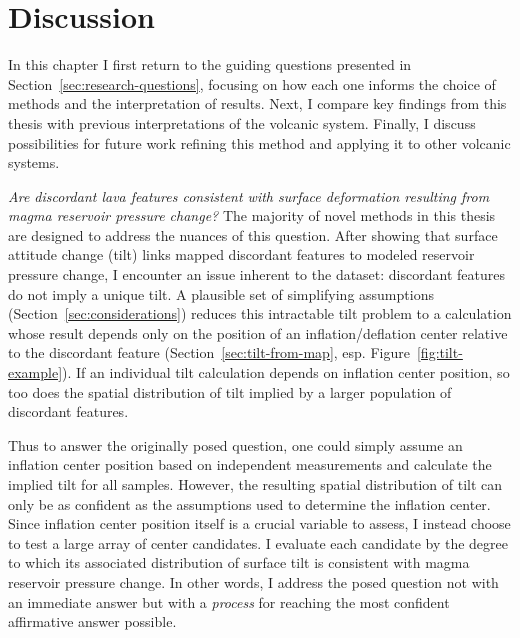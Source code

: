 \chapter{Discussion}\label{cha:discussion}

In this chapter I first return to the guiding questions presented in Section~\ref{sec:research-questions}, focusing on how each one informs the choice of methods and the interpretation of results. Next, I compare key findings from this thesis with previous interpretations of the volcanic system. Finally, I discuss possibilities for future work refining this method and applying it to other volcanic systems. 

\emph{Are discordant lava features consistent with surface deformation resulting from magma reservoir pressure change?} The majority of novel methods in this thesis are designed to address the nuances of this question. After showing that surface attitude change (tilt) links mapped discordant features to modeled reservoir pressure change, I encounter an issue inherent to the dataset: discordant features do not imply a unique tilt. A plausible set of simplifying assumptions (Section~\ref{sec:considerations}) reduces this intractable tilt problem to a calculation whose result depends only on the position of an inflation/deflation center relative to the discordant feature (Section~\ref{sec:tilt-from-map}, esp. Figure~\ref{fig:tilt-example}). If an individual tilt calculation depends on inflation center position, so too does the spatial distribution of tilt implied by a larger population of discordant features.

Thus to answer the originally posed question, one could simply assume an inflation center position based on independent measurements and calculate the implied tilt for all samples. However, the resulting spatial distribution of tilt can only be as confident as the assumptions used to determine the inflation center. Since inflation center position itself is a crucial variable to assess, I instead choose to test a large array of center candidates. I evaluate each candidate by the degree to which its associated distribution of surface tilt is consistent with magma reservoir pressure change. In other words, I address the posed question not with an immediate answer but with a \emph{process} for reaching the most confident affirmative answer possible.

